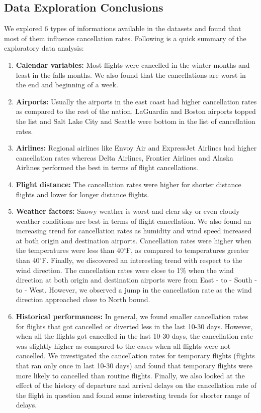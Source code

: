 \documentclass[12pt]{article}
\begin{document}
\subsection{Data Exploration Conclusions}
We explored 6 types of informations available in the datasets and found that most of them influence cancellation rates. Following is a quick summary of the exploratory data analysis:
\begin{enumerate}
\itemsep0em
\item \textbf{Calendar variables:} Most flights were cancelled in the winter months and least in the falls months. We also found that the cancellations are worst in the end and beginning of a week.
\item \textbf{Airports:} Usually the airports in the east coast had higher cancellation rates as compared to the rest of the nation. LaGuardia and Boston airports topped the list and Salt Lake City and Seattle were bottom in the list of cancellation rates. 
\item \textbf{Airlines:} Regional airlines like Envoy Air and ExpressJet Airlines had higher cancellation rates whereas Delta Airlines, Frontier Airlines and Alaska Airlines performed the best in terms of flight cancellations.
\item \textbf{Flight distance:} The cancellation rates were higher for shorter distance flights and lower for longer distance flights.  
\item \textbf{Weather factors:} Snowy weather is worst and clear sky or even cloudy weather conditions are best in terms of flight cancellation. We also found an increasing trend for cancellation rates as humidity and wind speed increased at both origin and destination airports. Cancellation rates were higher when the  temperatures were less than 40$^\circ$F, as compared to temperatures greater than 40$^\circ$F. Finally, we discovered an interesting trend with respect to the wind direction. The cancellation rates were close to 1$\%$ when the wind direction at both origin and destination airports were from East - to - South - to - West. However, we observed a jump in the cancellation rate as the wind direction approached close to North bound. 
\item \textbf{Historical performances:}  In general, we found smaller cancellation rates for flights that got cancelled or diverted less in the last 10-30 days. However, when all the flights got cancelled in the last 10-30 days, the cancellation rate was slightly higher as compared to the cases when all flights were not cancelled. We investigated the cancellation rates for temporary flights (flights that ran only once in last 10-30 days) and found that temporary flights were more likely to cancelled than routine flights. Finally, we also looked at the effect of the history of departure and arrival delays on the cancellation rate of the flight in question and found some interesting trends for shorter range of delays. 
\end{enumerate}
\end{document}
